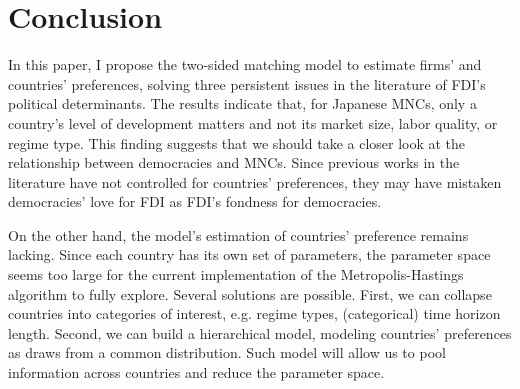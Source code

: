 \section{Conclusion}
\label{sec:conclusion}

In this paper, I propose the two-sided matching model to estimate firms' and countries' preferences, solving three persistent issues in the literature of FDI's political determinants. The results indicate that, for Japanese MNCs, only a country's level of development matters and not its market size, labor quality, or regime type. This finding suggests that we should take a closer look at the relationship between democracies and MNCs. Since previous works in the literature have not controlled for countries' preferences, they may have mistaken democracies' love for FDI as FDI's fondness for democracies.

On the other hand, the model's estimation of countries' preference remains lacking. Since each country has its own set of parameters, the parameter space seems too large for the current implementation of the Metropolis-Hastings algorithm to fully explore. Several solutions are possible. First, we can collapse countries into categories of interest, e.g. regime types, (categorical) time horizon length. Second, we can build a hierarchical model, modeling countries' preferences as draws from a common distribution. Such model will allow us to pool information across countries and reduce the parameter space.